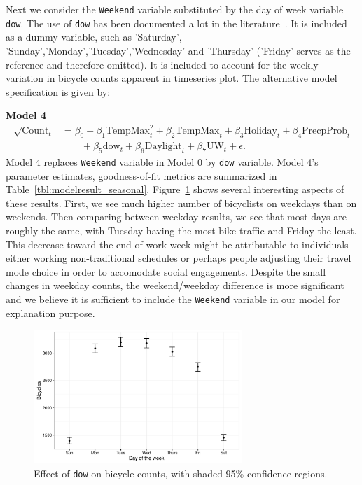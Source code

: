 \documentclass [11pt, proquest] {uwthesis}[2015/03/03]
\begin{document}

Next we consider the \texttt{Weekend} variable substituted by the day of week variable \texttt{dow}. The use of \texttt{dow} has been documented a lot in the literature~\cite{Miranda-Moreno:2011aa,Ahmed12}. It is included as a dummy variable, such as 'Saturday', 'Sunday','Monday','Tuesday','Wednesday' and 'Thursday' ('Friday' serves as the reference and therefore omitted). It is included to account for the weekly variation in bicycle counts apparent in timeseries plot. The alternative model specification is given by:

\textbf{Model 4}
\begin{align}
\sqrt{\text{Count}_t} &= \beta_0 + \beta_1 \text{TempMax}^2_t + \beta_2 \text{TempMax}_t + \beta_3 \text{Holiday}_t + \beta_4 \text{PrecpProb}_t \nonumber\\
&\qquad + \beta_5 \text{dow}_t  + \beta_6 \text{Daylight}_t + \beta_7 \text{UW}_t + \epsilon.\label{eqref:model4}
\end{align}
Model 4 replaces \texttt{Weekend} variable in Model 0 by \texttt{dow} variable. Model 4's parameter estimates, goodness-of-fit metrics are summarized in Table~\ref{tbl:modelresult_seasonal}. Figure~\ref{fig:dow} shows several interesting aspects of these results. First, we see much higher number of bicyclists on weekdays than on weekends. Then comparing between weekday results, we see that most days are roughly the same, with Tuesday having the most bike traffic and Friday the least. This decrease toward the end of work week might be attributable to individuals either working non-traditional schedules or perhaps people adjusting their travel mode choice in order to accomodate social engagements. Despite the small changes in weekday counts, the weekend/weekday difference is more significant and we believe it is sufficient to include the \texttt{Weekend} variable in our model for explanation purpose.

\begin{figure}
\centering
   \includegraphics[width=0.7\textwidth]{figures/sim/dow} 
  \caption{Effect of \texttt{dow} on bicycle counts, with shaded 95\% confidence regions.}
  \label{fig:dow}
\end{figure}
\end{document}
